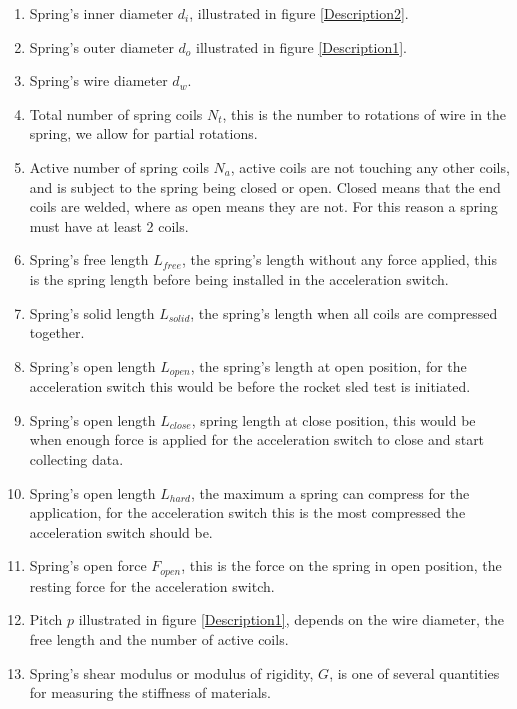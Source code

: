 \documentclass[10pt]{article}
\begin{document}
		\begin{enumerate}
			\item Spring's inner diameter $d_{i}$, illustrated in figure \ref{Description2}.
			
			\item Spring's outer diameter $d_{o}$ illustrated in figure \ref{Description1}.
			
			\item Spring's wire diameter $d_{w}$.
			
			\item Total number of spring coils $N_{t}$, this is the number to rotations of wire in the spring, we allow for partial rotations.
			
			\item Active number of spring coils $N_{a}$, active coils are not touching any other coils, and is subject to the spring being closed or open. Closed means that the end coils are welded, where as open means they are not. For this reason a spring must have at least 2 coils.

			\item Spring's free length $L_{free}$, the spring's length without any force applied, this is the spring length before being installed in the acceleration switch.
			
			\item Spring's solid length $L_{solid}$, the spring's length when all coils are compressed together.
			\item Spring's open length $L_{open}$, the spring's length at open position, for the acceleration switch this would be before the rocket sled test is initiated. 
			\item Spring's open length $L_{close}$, spring length at close position, this would be when enough force is applied for the acceleration switch to close and start collecting data.
			\item Spring's open length $L_{hard}$, the maximum a spring can compress for the application, for the acceleration switch this is the most compressed the acceleration switch should be. 
			\item Spring's open force $F_{open}$, this is the force on the spring in open position, the resting force for the acceleration switch.			
			
			\item Pitch $p$ illustrated in figure \ref{Description1}, depends on the wire diameter, the free length and the number of active coils.
			
			
			\item Spring's shear modulus or modulus of rigidity, $G$, is one of several quantities for measuring the stiffness of materials.
			

\end{enumerate}
\end{document}
